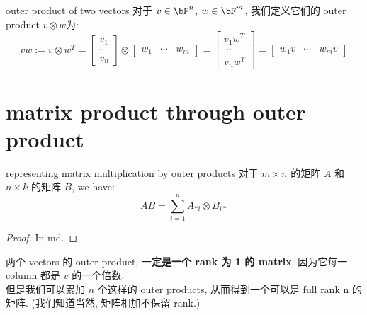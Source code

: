 \begin{definition}{outer product of two vectors}
    对于 $v \in \bF^n$, $w \in \bF^m$, 我们定义它们的 outer product $v \otimes w$为:
    $$
    v w := v \otimes w^T = \begin{bmatrix} v_{1}  \\ \cdots  \\v_{n} \end{bmatrix} \otimes\begin{bmatrix} w_{1}  & \cdots  &w_{m} \end{bmatrix} = \begin{bmatrix} v_{1}w^T  \\ \cdots  \\v_{n}w^T \end{bmatrix} = \begin{bmatrix} w_{1}v  & \cdots  &w_{m}v \end{bmatrix}
    $$
\end{definition}

\section{matrix product through outer product}

\begin{theorem}{representing matrix multiplication by outer products}
对于 $m\times n$ 的矩阵 $A$ 和 $n \times k$ 的矩阵 $B$, we have:
\begin{equation}
    A B = \sum_{i=1}^n A_{*i} \otimes B _{i*}
\end{equation}
\end{theorem}
\begin{proof}
    In md.
\end{proof}
\begin{remark}
    两个 vectors 的 outer product, 一\textbf{定是一个 rank 为 1 的 matrix}. 因为它每一 column 都是 $v$ 的一个倍数.\\
    但是我们可以累加 $n$ 个这样的 outer products, 从而得到一个可以是 full rank n 的矩阵. (我们知道当然, 矩阵相加不保留 rank.)
\end{remark}


